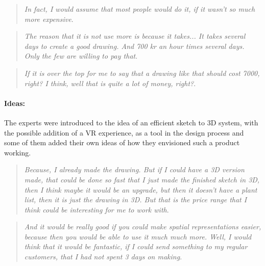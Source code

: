 		\begin{quote}
			\textit{In fact, I would assume that most people would do it, if it wasn't so much more expensive}\label{quote:expertRessources2}.\\
		\end{quote}
		
		\begin{quote}
			\textit{The reason that it is not use more is because it takes... It takes several days to create a good drawing. And 700 kr an hour times several days. Only the few are willing to pay that}\label{quote:expertRessources3}.\\
		\end{quote}
		
		\begin{quote}
			\textit{If it is over the top for me to say that a drawing like that should cost 7000, right? I think, well that is quite a lot of money, right?}\label{quote:expertRessources4}.\\
		\end{quote}
		
		\paragraph*{Ideas:}
		The experts were introduced to the idea of an efficient sketch to 3D system, with the possible addition of a VR experience, as a tool in the design process and some of them added their own ideas of how they envisioned such a product working.\\
		
		\begin{quote}
			\textit{Because, I already made the drawing. But if I could have a 3D version made, that could be done so fast that I just made the finished sketch in 3D, then I think maybe it would be an upgrade, but then it doesn't have a plant list, then it is just the drawing in 3D. But that is the price range that I think could be interesting for me to work with}\label{quote:expertIdeas1}.\\
		\end{quote}
		
		\begin{quote}
			\textit{And it would be really good if you could make spatial representations easier, because then you would be able to use it much much more. Well, I would think that it would be fantastic, if I could send something to my regular customers, that I had not spent 3 days on making}\label{quote:expertIdeas2}.\\
		\end{quote}
		
